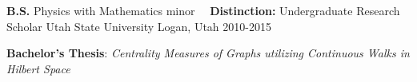 

\begin{cventries}


\cventry
{\textbf{B.S.} Physics with Mathematics minor \ \ \textbf{Distinction:} Undergraduate Research Scholar} %
{Utah State University} %
{Logan, Utah} %
{2010-2015} %
{ %
\begin{cvitems}
\item {\textbf{Bachelor's Thesis}: \textit{Centrality Measures of Graphs utilizing Continuous Walks in Hilbert Space}}
\end{cvitems}
}


\end{cventries}